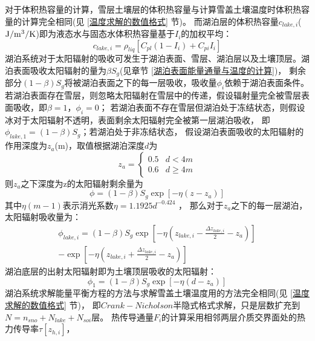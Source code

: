 对于体积热容量的计算，雪层土壤层的体积热容量与计算雪盖土壤温度时体积热容量的计算完全相同(见 \ref{温度求解的数值格式} 节)。
而湖泊层的体积热容量$c_{lake,i}$($\rm J/m^3/K$)即为液态水与固态水体积热容量基于$I_i$的加权平均：
\begin{equation}
c_{lake, i}=\rho_{liq}\left[C_{p l}\left(1-I_{i}\right)+C_{p i} I_{i}\right]
\end{equation}
湖泊系统对于太阳辐射的吸收可发生于湖泊表面、雪层、湖泊层以及土壤顶层。湖泊表面吸收太阳辐射的量为$\beta S_g$(见章节 \ref{湖泊表面能量通量与温度的计算})，
剩余部分$\left(1-\beta\right)S_g$将被湖泊表面之下的每一层吸收，吸收量$\phi_i$依赖于湖泊表面条件。
若湖泊表面存在雪层，则忽略太阳辐射在雪层中的传递，假设辐射量完全被雪层表面吸收，即$\beta=1$，$\phi_i=0$；
若湖泊表面不存在雪层但湖泊处于冻结状态，则假设冰对于太阳辐射不透明，表面剩余太阳辐射完全被第一层湖泊吸收，
即$\phi_{lake,1}=\left(1-\beta\right)S_g$；若湖泊处于非冻结状态，
假设湖泊表面吸收的太阳辐射的作用深度为$z_a$(m)，取值根据湖泊深度$d$为
\begin{equation}
z_{a}=\left\{\begin{array}{ll}0.5 & d<4 m \\ 0.6 & d \geq 4 m\end{array}\right.
\end{equation}
则$z_a$之下深度为z的太阳辐射剩余量为
\begin{equation}
\phi=(1-\beta) S_{g} \exp \left[-\eta\left(z-z_{a}\right)\right]
\end{equation}
其中$\eta(m-1)$表示消光系数$\eta=1.1925d^{-0.424}$ \citep{subin2012improved}，
那么对于$z_a$之下的每一层湖泊，太阳辐射吸收量为：
\begin{equation}
\begin{array}{l}
    \phi_{lake, i}=(1-\beta) S_{g} \exp \left[-\eta\left(z_{lake, i}-\frac{\Delta z_{lake, i}}{2}-z_{a}\right)\right] \\
     -\exp \left[-\eta\left(z_{lake, i}+\frac{\Delta z_{lake, i}}{2}-z_{a}\right)\right]
\end{array}
\end{equation}
湖泊底层的出射太阳辐射即为土壤顶层吸收的太阳辐射：
\begin{equation}
\phi_{1}=(1-\beta) S_{g} \exp \left[-\eta\left(d-z_{a}\right)\right]
\end{equation}
湖泊系统求解能量平衡方程的方法与求解雪盖土壤温度用的方法完全相同(见 \ref{温度求解的数值格式} 节)，
即$Crank-Nicholson$半隐式格式求解，只是层数扩充到$N=n_{sno}+N_{lake}+N_{soi}$层。
热传导通量$F_i$的计算采用相邻两层介质交界面处的热力传导率$\tau\left[z_{h,i}\right]$，
